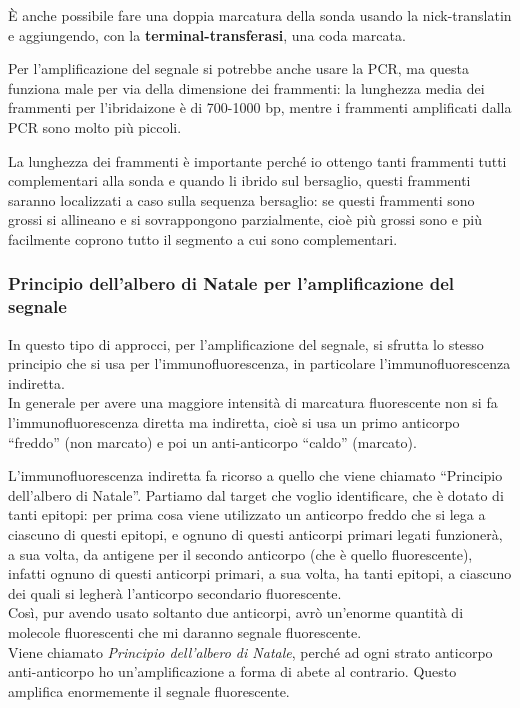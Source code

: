 \documentclass[11pt]{book}
\begin{document}
È anche possibile fare una doppia marcatura della sonda usando la nick-translatin e aggiungendo, con la \textbf{terminal-transferasi}, una coda marcata.

Per l’amplificazione del segnale si potrebbe anche usare la PCR, ma questa funziona male per via della dimensione dei frammenti: la lunghezza media dei frammenti per l'ibridaizone è di 700-1000 bp, mentre i frammenti amplificati dalla PCR sono molto più piccoli.
 
La lunghezza dei frammenti è importante perché io ottengo tanti frammenti tutti complementari alla sonda e quando li ibrido sul bersaglio, questi frammenti saranno localizzati a caso sulla sequenza bersaglio: se questi frammenti sono grossi si allineano e si sovrappongono parzialmente, cioè più grossi sono e più facilmente coprono tutto il segmento a cui sono complementari.

\subsubsection{Principio dell’albero di Natale per l’amplificazione del segnale}
In questo tipo di approcci, per l’amplificazione del segnale, si sfrutta lo stesso principio che si usa per l’immunofluorescenza, in particolare l’immunofluorescenza indiretta.\\
In generale per avere una maggiore intensità di marcatura fluorescente non si fa l’immunofluorescenza diretta ma indiretta, cioè si usa un primo anticorpo ``freddo'' (non marcato) e poi un anti-anticorpo ``caldo'' (marcato).

L’immunofluorescenza indiretta fa ricorso a quello che viene chiamato ``Principio dell’albero di Natale''. Partiamo dal target che voglio identificare, che è dotato di tanti epitopi: per prima cosa viene utilizzato un anticorpo freddo che si lega a ciascuno di questi epitopi, e ognuno di questi anticorpi primari legati funzionerà, a sua volta, da antigene per il secondo anticorpo (che è quello fluorescente), infatti ognuno di questi anticorpi primari, a sua volta, ha tanti epitopi, a ciascuno dei quali si legherà l’anticorpo secondario fluorescente.\\
Così, pur avendo usato soltanto due anticorpi, avrò un’enorme quantità di molecole fluorescenti che mi daranno segnale fluorescente.\\
Viene chiamato \emph{Principio dell’albero di Natale}, perché ad ogni strato anticorpo anti-anticorpo ho un’amplificazione a forma di abete al contrario. Questo amplifica enormemente il segnale fluorescente.
\end{document}
